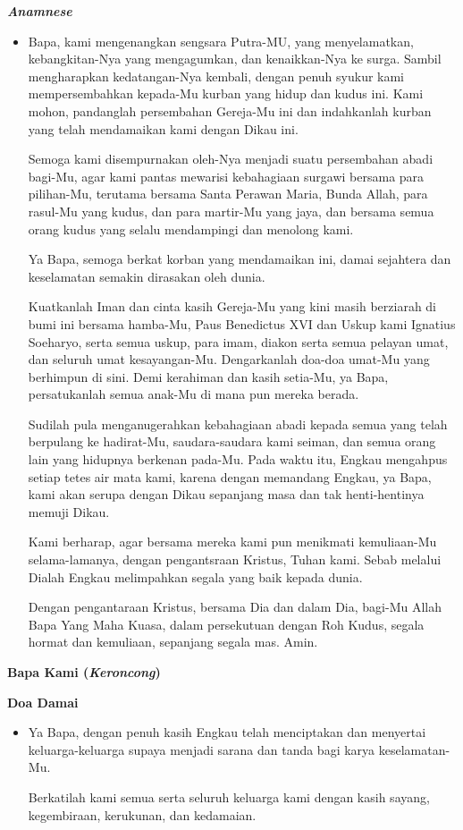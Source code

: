 \documentclass[12pt,two pages]{scrbook}
\makeatletter
\newcommand{\subjudul}[1]{%
  {\parindent \z@ \normalfont
    \interlinepenalty\@M \bfseries #1\par\nobreak \vskip 20\p@ }}
\newcommand{\lagu}[1]{%
  {\parindent \z@ \normalfont
    \interlinepenalty\@M \bfseries \emph{#1}\par\nobreak \vskip 20\p@ }}
\newcommand{\BI}[1]{\begin{itemize} \item[I:] #1 \end{itemize}}
\makeatother
\begin{document}
\lagu{Anamnese}

\BI{Bapa, kami mengenangkan sengsara Putra-MU, yang menyelamatkan, kebangkitan-Nya yang mengagumkan, dan kenaikkan-Nya ke surga. Sambil mengharapkan kedatangan-Nya kembali, dengan penuh syukur kami mempersembahkan kepada-Mu kurban yang hidup dan kudus ini. Kami mohon, pandanglah persembahan Gereja-Mu ini dan indahkanlah kurban yang telah mendamaikan kami dengan Dikau ini.

Semoga kami disempurnakan oleh-Nya menjadi suatu persembahan abadi bagi-Mu, agar kami pantas mewarisi kebahagiaan surgawi bersama para pilihan-Mu, terutama bersama Santa Perawan Maria, Bunda Allah, para rasul-Mu yang kudus, dan para martir-Mu yang jaya, dan bersama semua orang kudus yang selalu mendampingi dan menolong kami.

Ya Bapa, semoga berkat korban yang mendamaikan ini, damai sejahtera dan keselamatan semakin dirasakan oleh dunia.

Kuatkanlah Iman dan cinta kasih Gereja-Mu yang kini masih berziarah di bumi ini bersama hamba-Mu, Paus Benedictus XVI dan Uskup kami Ignatius Soeharyo, serta semua uskup, para imam, diakon serta semua pelayan umat, dan seluruh umat kesayangan-Mu. Dengarkanlah doa-doa umat-Mu yang berhimpun di sini. Demi kerahiman dan kasih setia-Mu, ya Bapa, persatukanlah semua anak-Mu di mana pun mereka berada.

Sudilah pula menganugerahkan kebahagiaan abadi kepada semua yang telah berpulang ke hadirat-Mu, saudara-saudara kami seiman, dan semua orang lain yang hidupnya berkenan pada-Mu. Pada waktu itu, Engkau mengahpus setiap tetes air mata kami, karena dengan memandang Engkau, ya Bapa, kami akan serupa dengan Dikau sepanjang masa dan tak henti-hentinya memuji Dikau.

Kami berharap, agar bersama mereka kami pun menikmati kemuliaan-Mu selama-lamanya, dengan pengantsraan Kristus, Tuhan kami. Sebab melalui Dialah Engkau melimpahkan segala yang baik kepada dunia.

Dengan pengantaraan Kristus, bersama Dia dan dalam Dia, bagi-Mu Allah Bapa Yang Maha Kuasa, dalam persekutuan dengan Roh Kudus, segala hormat dan kemuliaan, sepanjang segala mas. Amin.}

\subjudul{Bapa Kami (\emph{Keroncong})}

\subjudul{Doa Damai}

\BI{Ya Bapa, dengan penuh kasih Engkau telah menciptakan dan menyertai keluarga-keluarga supaya menjadi sarana dan tanda bagi karya keselamatan-Mu.

Berkatilah kami semua serta seluruh keluarga kami dengan kasih sayang, kegembiraan, kerukunan, dan kedamaian.}
\end{document}
